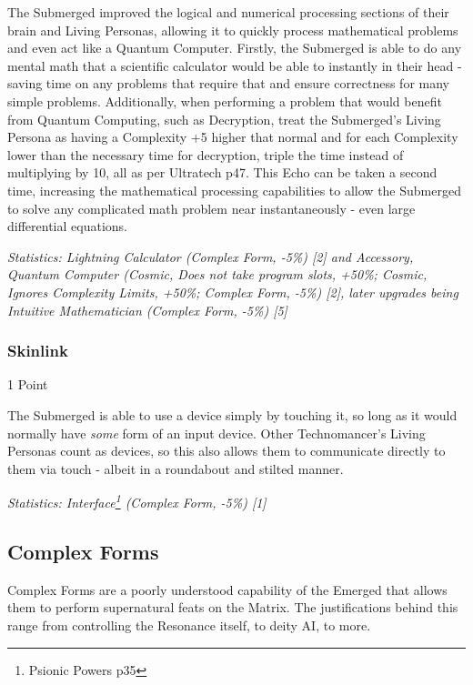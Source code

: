 \begin{multicols*}{3}
	The Submerged improved the logical and numerical processing sections of their brain and Living Personas, allowing it to quickly process mathematical problems and even act like a Quantum Computer. Firstly, the Submerged is able to do any mental math that a scientific calculator would be able to instantly in their head - saving time on any problems that require that and ensure correctness for many simple problems. Additionally, when performing a problem that would benefit from Quantum Computing, such as Decryption, treat the Submerged's Living Persona as having a Complexity +5 higher that normal and for each Complexity lower than the necessary time for decryption, triple the time instead of multiplying by 10, all as per Ultratech p47. This Echo can be taken a second time, increasing the mathematical processing capabilities to allow the Submerged to solve any complicated math problem near instantaneously - even large differential equations.
	
	\textit{\textcolor{OliveGreen}{Statistics: Lightning Calculator (Complex Form, -5\%) [2] and Accessory, Quantum Computer (Cosmic, Does not take program slots, +50\%; Cosmic, Ignores Complexity Limits, +50\%; Complex Form, -5\%) [2], later upgrades being Intuitive Mathematician (Complex Form, -5\%) [5] }}
		
	\subsubsection{Skinlink}
	\begin{flushright}
		1 Point
	\end{flushright}
	
	The Submerged is able to use a device simply by touching it, so long as it would normally have \textit{some} form of an input device. Other Technomancer's Living Personas count as devices, so this also allows them to communicate directly to them via touch - albeit in a roundabout and stilted manner.
	
	\textit{\textcolor{OliveGreen}{Statistics: Interface\footnote{Psionic Powers p35} (Complex Form, -5\%) [1] }}
	
	\subsection{Complex Forms}
	
	Complex Forms are a poorly understood capability of the Emerged that allows them to perform supernatural feats on the Matrix. The justifications behind this range from controlling the Resonance itself, to deity AI, to more.
	

\end{multicols*}
